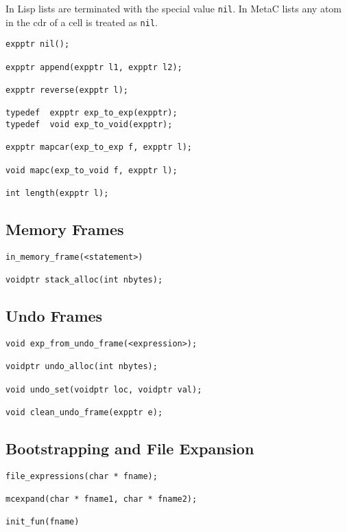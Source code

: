 \documentclass{article}
\begin{document}
In Lisp lists are terminated with the special value {\tt nil}.  In MetaC lists any atom in the
cdr of a cell is treated as {\tt nil}.

\begin{verbatim}
expptr nil();

expptr append(expptr l1, expptr l2);

expptr reverse(expptr l);

typedef  expptr exp_to_exp(expptr);
typedef  void exp_to_void(expptr);

expptr mapcar(exp_to_exp f, expptr l);

void mapc(exp_to_void f, expptr l);

int length(expptr l);
\end{verbatim}

\subsection{Memory Frames}

\begin{verbatim}
in_memory_frame(<statement>)

voidptr stack_alloc(int nbytes);
\end{verbatim}

\subsection{Undo Frames}

\begin{verbatim}
void exp_from_undo_frame(<expression>);

voidptr undo_alloc(int nbytes);

void undo_set(voidptr loc, voidptr val);

void clean_undo_frame(expptr e);
\end{verbatim}

\subsection{Bootstrapping and File Expansion}

\begin{verbatim}
file_expressions(char * fname);

mcexpand(char * fname1, char * fname2);

init_fun(fname)
\end{verbatim}




\end{document}
